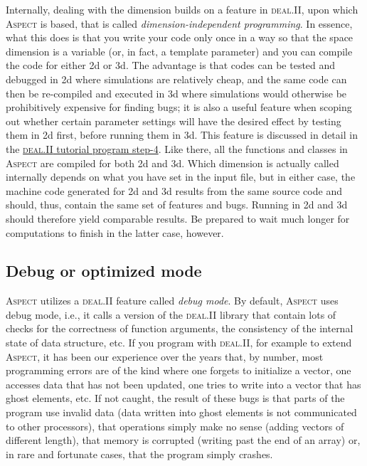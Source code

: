 \documentclass{article}
\newcommand{\dealii}{{\textsc{deal.II}}}
\newcommand{\aspect}{\textsc{Aspect}}
\begin{document}
Internally, dealing with the dimension builds on a feature in
\dealii{}, upon which \aspect{} is based, that is called
\textit{dimension-independent programming}. In essence, what this does is that
you write your code only once in a way so that the space dimension is a
variable (or, in fact, a template parameter) and you can compile the code for
either 2d or 3d. The advantage is that codes can be tested and debugged in 2d
where simulations are relatively cheap, and the same code can then be
re-compiled and executed in 3d where simulations would otherwise be
prohibitively expensive for finding bugs; it is also a useful feature when
scoping out whether certain parameter settings will have the desired effect by
testing them in 2d first, before running them in 3d. This feature is discussed
in detail in the
\href{http://www.dealii.org/developer/doxygen/deal.II/step_4.html}{\dealii{}
  tutorial program step-4}.
Like there, all the functions and classes in
\aspect{} are compiled for both 2d and 3d. Which dimension is actually
called internally depends on what you have set in the input file, but
in either case, the machine code generated for 2d and 3d results from
the same source code and should, thus, contain the same set of
features and bugs. Running in 2d and 3d should therefore yield
comparable results. Be prepared to wait much longer for
computations to finish in the latter case, however.


\subsection{Debug or optimized mode}
\label{sec:debug-mode}

\aspect{} utilizes a \dealii{} feature called \textit{debug
  mode}. By default, \aspect{} uses debug mode, i.e., it calls a version of
the \dealii{} library that contain lots of checks for the correctness of
function arguments, the consistency of the internal state of data structure,
etc. If you program with \dealii{}, for example to extend \aspect{}, it has
been our experience over the years that, by number, most programming errors are of the
kind where one forgets to initialize a vector, one accesses data that has not
been updated, one tries to write into a vector that has ghost elements,
etc. If not caught, the result of these bugs is that parts of the program use
invalid data (data written into ghost elements is not communicated to other
processors), that operations simply make no sense (adding vectors of different
length), that memory is corrupted (writing past the end of an array) or, in
rare and fortunate cases, that the program simply crashes.
\end{document}
